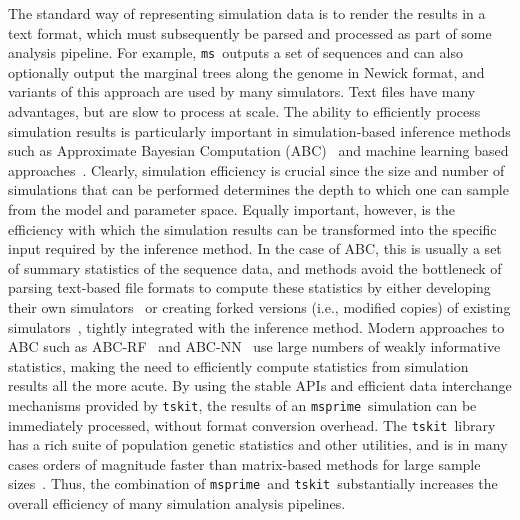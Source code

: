 \documentclass[9pt,twocolumn,twoside,lineno]{gsajnl}
\newcommand{\msprime}[0]{\texttt{msprime}}
\newcommand{\tskit}[0]{\texttt{tskit}}
\newcommand{\ms}[0]{\texttt{ms}}
\begin{document}
The standard way of representing simulation data is
to render the results in a text format, which must subsequently
be parsed and processed as part of some analysis pipeline. For example,
\ms\ outputs a set of sequences
and can also optionally output the marginal trees along
the genome in Newick format,
and variants of this approach are used by many simulators.
Text files have many advantages, but are slow to process at scale.
The ability to efficiently process simulation results is
particularly important in simulation-based inference methods
such as Approximate Bayesian Computation
(ABC)~\citep{beaumont2002approximate,csillery2010approximate,wegmann2010abctoolbox}
and machine learning based
approaches~\citep{sheehan2016deep,chan2018likelihood,schrider2018supervised,
flagel2019unreasonable,sanchez2020deep}. Clearly, simulation efficiency is
crucial since the size and number of simulations that can be performed determines
the depth to which one can sample from the model and parameter space.
Equally important,
however, is the efficiency with which the simulation results can be
transformed into the specific input required by the inference method.
In the case of ABC, this is usually a set of summary statistics of the sequence
data, and methods avoid the bottleneck of parsing
text-based file formats to compute these statistics
by either developing their own
simulators~\citep[e.g.][]{cornuet2008inferring,lopes2009popabc}
or creating forked versions (i.e., modified copies) of existing
simulators~\cite[e.g.][]{thornton2006approximate,
hickerson2007msbayes,pavlidis2010msabc,huang2011mtml,quinto2018modeling},
tightly integrated with the inference method.
Modern approaches to ABC such as
ABC-RF~\citep{raynal2019abc,pudlo2016abc} and
ABC-NN~\citep{csillery2012abc,blum2010abc} use large
numbers of weakly informative statistics,
making the need to efficiently compute statistics from simulation
results all the more acute.
By using the stable APIs and efficient data interchange mechanisms
provided by \tskit,
the results of an \msprime\ simulation can be immediately processed,
without format conversion overhead.
The \tskit\ library has a rich suite of population
genetic statistics and other utilities, and is in many cases
orders of magnitude faster than matrix-based methods for
large sample sizes~\citep{ralph2020efficiently}. Thus, the combination
of \msprime\ and \tskit\ substantially increases the overall
efficiency of many simulation analysis pipelines.
\end{document}

